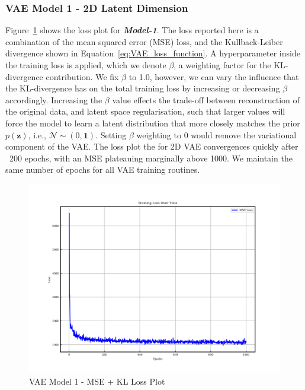 \documentclass{article}
\begin{document}
\subsubsection{VAE Model 1 - 2D Latent Dimension}

Figure~\ref{fig:model1_loss_plot} shows the loss plot for \textbf{\textit{Model-1}}. The loss reported here is a combination of the mean squared error (MSE) loss, and the Kullback-Leiber divergence shown in Equation~\ref{eq:VAE_loss_function}. A hyperparameter inside the training loss is applied, which we denote $\beta$, a weighting factor for the KL-divergence contribution. We fix $\beta$ to 1.0, however, we can vary the influence that the KL-divergence has on the total training loss by increasing or decreasing $\beta$ accordingly. Increasing the $\beta$ value effects the trade-off between reconstruction of the original data, and latent space regularisation, such that larger values will force the model to learn a latent distribution that more closely matches the prior $p(\textbf{z})$, i.e., $\mathcal{N}\sim(0,\textbf{1})$. Setting $\beta$ weighting to 0 would remove the variational component of the VAE. The loss plot the for 2D VAE convergences quickly after ~200 epochs, with an MSE plateauing marginally above 1000. We maintain the same number of epochs for all VAE training routines.

\begin{figure}[H]
\centering
    \includegraphics[width=0.75\linewidth]{figures/VAEmodels/model1/loss_plot.png}
    \caption{VAE Model 1 - MSE + KL Loss Plot}
    \label{fig:model1_loss_plot}
\end{figure}
\end{document}
